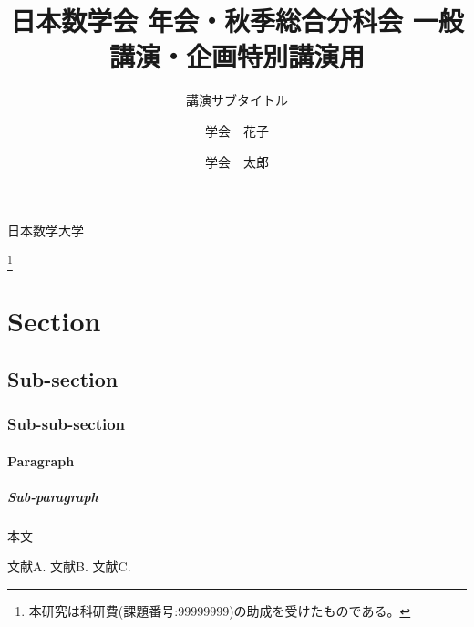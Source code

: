 \documentclass{msjproc}
\begin{document}
  \title{日本数学会 年会・秋季総合分科会 一般講演・企画特別講演用}
  \subtitle{講演サブタイトル}

  \author{学会　花子}{日本数学大学}
  \address{〒110-0016 東京都台東区台東1-34-8　日本数学大学 大学院理学研究科}

  \author{学会　太郎}{}


  \thanks{本研究は科研費(課題番号:99999999)の助成を受けたものである。}

  \maketitle


  \section{Section}
  \subsection{Sub-section}
  \subsubsection{Sub-sub-section}
  \paragraph{Paragraph}
  \subparagraph{Sub-paragraph}
  本文

  \begin{thebibliography}{9}
    文献A.
    文献B.
    文献C.
  \end{thebibliography}

\end{document}
